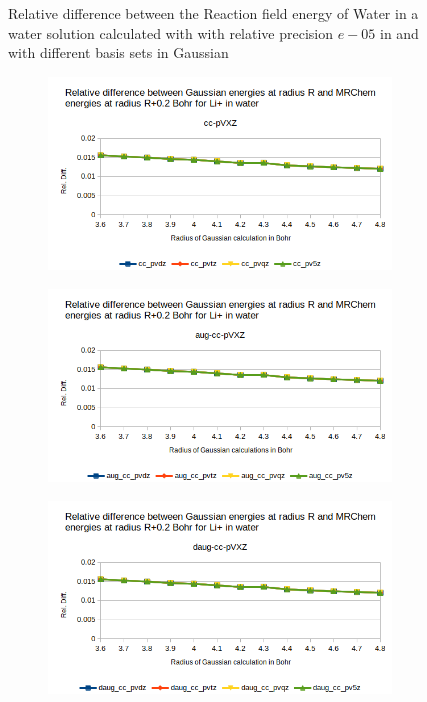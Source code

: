 \documentclass[../master_thesis.tex]{subfiles}
\begin{document}
\begin{figure}[h!]
\begin{subfigure}[b]{0.75\linewidth}
  \end{subfigure}
  \caption{Relative difference between the Reaction field energy of Water in a water solution calculated with with relative precision $e-05$ in \mrchem
  and with different basis sets in Gaussian}
  \label{fig:watreldiff02}
\end{figure}

\begin{figure}[h!]
  \centering
  \begin{subfigure}[b]{0.75\linewidth}
    \includegraphics[width=\linewidth]{img/lipreldiff02.png}
  \end{subfigure}
  \begin{subfigure}[b]{0.75\linewidth}
    \includegraphics[width=\linewidth]{img/lipaugreldiff02.png}
  \end{subfigure}
  \begin{subfigure}[b]{0.75\linewidth}
    \includegraphics[width=\linewidth]{img/lipdaugreldiff02.png}

\end{subfigure}
\end{figure}
\end{document}
